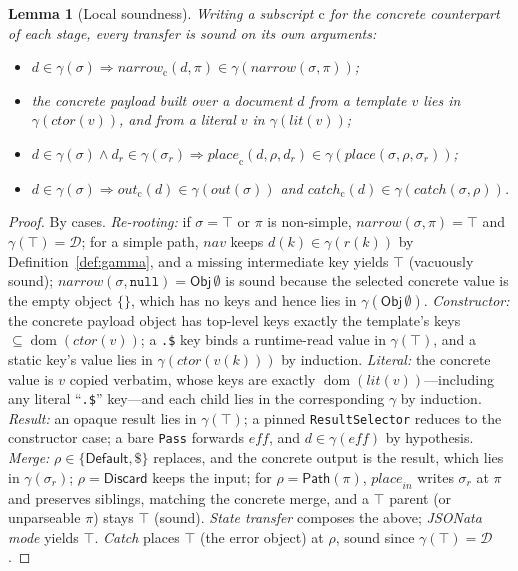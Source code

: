 \documentclass[11pt]{article}
\newcommand{\dom}{\operatorname{dom}}
\newcommand{\Obj}{\mathsf{Obj}}
\newcommand{\narrow}{\mathit{narrow}}
\newcommand{\place}{\mathit{place}}
\newcommand{\eff}{\mathit{eff}}
\theoremstyle{plain}
\newtheorem{lemma}{Lemma}
\theoremstyle{definition}
\theoremstyle{remark}
\begin{document}
\begin{lemma}[Local soundness]\label{lem:local}
Writing a subscript $\mathrm{c}$ for the concrete counterpart of each stage, every transfer is
sound on its own arguments:
\begin{itemize}
\item[(re-root)] $d\in\gamma(\sigma)\Rightarrow \narrow_{\mathrm{c}}(d,\pi)\in\gamma(\narrow(\sigma,\pi))$;
\item[(build)] the concrete payload built over a document $d$ from a template $v$ lies in
$\gamma(\mathit{ctor}(v))$, and from a literal $v$ in $\gamma(\mathit{lit}(v))$;
\item[(merge)] $d\in\gamma(\sigma)\wedge d_r\in\gamma(\sigma_r)\Rightarrow
\place_{\mathrm{c}}(d,\rho,d_r)\in\gamma(\place(\sigma,\rho,\sigma_r))$;
\item[(state/catch)] $d\in\gamma(\sigma)\Rightarrow
\mathit{out}_{\mathrm{c}}(d)\in\gamma(\mathit{out}(\sigma))$ and
$\mathit{catch}_{\mathrm{c}}(d)\in\gamma(\mathit{catch}(\sigma,\rho))$.
\end{itemize}
\end{lemma}
\begin{proof}
By cases. \emph{Re-rooting:} if $\sigma=\top$ or $\pi$ is non-simple, $\narrow(\sigma,\pi)=\top$
and $\gamma(\top)=\mathcal{D}$; for a simple path, $\mathit{nav}$ keeps $d(k)\in\gamma(r(k))$ by
Definition~\ref{def:gamma}, and a missing intermediate key yields $\top$ (vacuously sound);
$\narrow(\sigma,\texttt{null})=\Obj\,\emptyset$ is sound because the selected concrete value is
the empty object $\{\}$, which has no keys and hence lies in $\gamma(\Obj\,\emptyset)$.
\emph{Constructor:} the concrete payload object has top-level keys exactly the template's keys
$\subseteq\dom(\mathit{ctor}(v))$; a \texttt{.\$} key binds a runtime-read value in
$\gamma(\top)$, and a static key's value lies in $\gamma(\mathit{ctor}(v(k)))$ by induction.
\emph{Literal:} the concrete value is $v$ copied verbatim, whose keys are exactly
$\dom(\mathit{lit}(v))$---including any literal ``\texttt{.\$}'' key---and each child lies in the
corresponding $\gamma$ by induction. \emph{Result:} an opaque result lies in $\gamma(\top)$; a
pinned \texttt{ResultSelector} reduces to the constructor case; a bare \texttt{Pass} forwards
$\eff$, and $d\in\gamma(\eff)$ by hypothesis. \emph{Merge:} $\rho\in\{\textsf{Default},\$\}$
replaces, and the concrete output is the result, which lies in $\gamma(\sigma_r)$;
$\rho=\textsf{Discard}$ keeps the input; for $\rho=\textsf{Path}(\pi)$, $\place_{\mathit{in}}$
writes $\sigma_r$ at $\pi$ and preserves siblings, matching the concrete merge, and a $\top$
parent (or unparseable $\pi$) stays $\top$ (sound). \emph{State transfer} composes the above;
\emph{JSONata mode} yields $\top$. \emph{Catch} places $\top$ (the error object) at $\rho$,
sound since $\gamma(\top)=\mathcal{D}$.
\end{proof}
\end{document}
